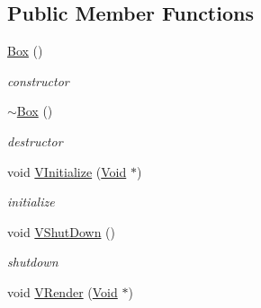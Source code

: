 \subsection*{Public Member Functions}
\begin{DoxyCompactItemize}
\item 
\hypertarget{classContent_1_1Shape_1_1Physics_1_1Box_ab5d948a0fc561a28dfe7882b026d52c9}{
\hyperlink{classContent_1_1Shape_1_1Physics_1_1Box_ab5d948a0fc561a28dfe7882b026d52c9}{Box} ()}
\label{classContent_1_1Shape_1_1Physics_1_1Box_ab5d948a0fc561a28dfe7882b026d52c9}

\begin{DoxyCompactList}\small\item\em constructor \item\end{DoxyCompactList}\item 
\hypertarget{classContent_1_1Shape_1_1Physics_1_1Box_a01e0f0a7981edea34c6a485aec6c9990}{
\hyperlink{classContent_1_1Shape_1_1Physics_1_1Box_a01e0f0a7981edea34c6a485aec6c9990}{$\sim$Box} ()}
\label{classContent_1_1Shape_1_1Physics_1_1Box_a01e0f0a7981edea34c6a485aec6c9990}

\begin{DoxyCompactList}\small\item\em destructor \item\end{DoxyCompactList}\item 
\hypertarget{classContent_1_1Shape_1_1Physics_1_1Box_a49308d7ecc9750aaecb3f6259daf01b3}{
void \hyperlink{classContent_1_1Shape_1_1Physics_1_1Box_a49308d7ecc9750aaecb3f6259daf01b3}{VInitialize} (\hyperlink{structVoid}{Void} $\ast$)}
\label{classContent_1_1Shape_1_1Physics_1_1Box_a49308d7ecc9750aaecb3f6259daf01b3}

\begin{DoxyCompactList}\small\item\em initialize \item\end{DoxyCompactList}\item 
\hypertarget{classContent_1_1Shape_1_1Physics_1_1Box_a9415d7f5457eceabf95a1f46573b1af4}{
void \hyperlink{classContent_1_1Shape_1_1Physics_1_1Box_a9415d7f5457eceabf95a1f46573b1af4}{VShutDown} ()}
\label{classContent_1_1Shape_1_1Physics_1_1Box_a9415d7f5457eceabf95a1f46573b1af4}

\begin{DoxyCompactList}\small\item\em shutdown \item\end{DoxyCompactList}\item 
\hypertarget{classContent_1_1Shape_1_1Physics_1_1Box_af73c6e6fddae7697a239b85679b5efd8}{
void \hyperlink{classContent_1_1Shape_1_1Physics_1_1Box_af73c6e6fddae7697a239b85679b5efd8}{VRender} (\hyperlink{structVoid}{Void} $\ast$)}
\label{classContent_1_1Shape_1_1Physics_1_1Box_af73c6e6fddae7697a239b85679b5efd8}


\end{DoxyCompactItemize}
